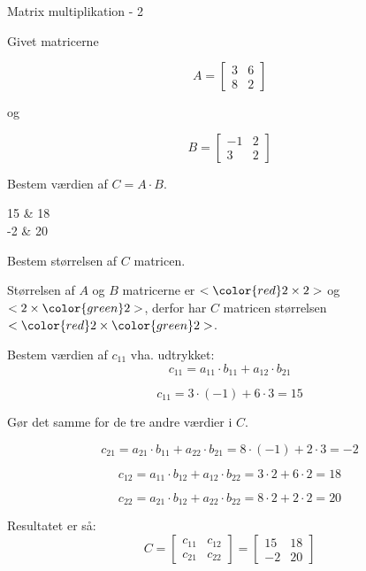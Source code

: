 \documentclass{article}
\begin{document}
\newpage

\begin{exercise}{Matrix multiplikation - 2}

Givet matricerne

\[
A = \left[\begin{array}{rr}
3 & 6 \\
8 & 2
\end{array} \right]
\]

og

\[
B = \left[\begin{array}{rr}
-1 & 2 \\
3 & 2
\end{array} \right]
\]

Bestem værdien af $C = A \cdot B$.

\begin{answermatrix}
15 & 18 \\
-2 & 20
\end{answermatrix}

\hint
Bestem størrelsen af $C$ matricen.

\hint
Størrelsen af $A$ og $B$ matricerne er $<{\color{red} 2} \times 2>$ og $<2 \times {\color{green}2}>$,
derfor har $C$ matricen størrelsen $<{\color{red} 2} \times {\color{green}2}>$.

\hint
Bestem værdien af $c_{11}$ vha. udtrykket:
\[
c_{11} = a_{11} \cdot b_{11} + a_{12} \cdot b_{21}
\]

\hint
\[
c_{11} = 3 \cdot (-1) + 6 \cdot 3 = 15
\]

\hint
Gør det samme for de tre andre værdier i $C$.

\hint
\[
c_{21} = a_{21} \cdot b_{11} + a_{22} \cdot b_{21} = 8 \cdot (-1) + 2 \cdot 3 = -2
\]

\hint
\[
c_{12} = a_{11} \cdot b_{12} + a_{12} \cdot b_{22} = 3 \cdot 2 + 6 \cdot 2 = 18
\]

\hint
\[
c_{22} = a_{21} \cdot b_{12} + a_{22} \cdot b_{22} = 8 \cdot 2 + 2 \cdot 2 = 20
\]


\hint
Resultatet er så:
\[
C = \left[\begin{array}{rr}
c_{11} & c_{12} \\
c_{21} & c_{22}
\end{array} \right] =
\left[\begin{array}{rr}
15 & 18 \\
-2 & 20
\end{array} \right]
\]


\end{exercise}
\end{document}

